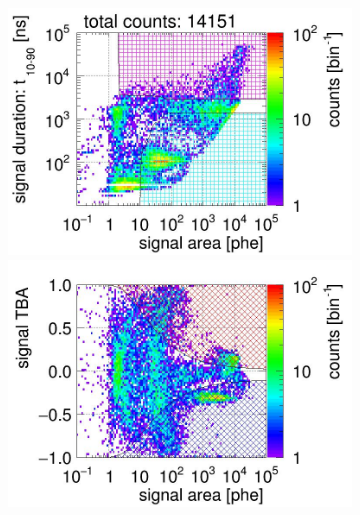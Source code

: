 \begin{landscape}%
	\begin{figure}[!p]
		\centering
		\begin{subfigure}[t]{0.32\textwidth} %
			\centering
			\includegraphics[width=\figurewidth,clip,trim={0 98 0 15}]{Figures/GasTest/CutsValid/res64850/pdpa22Vecfig64850.jpg}
			\includegraphics[width=\figurewidth,clip,trim={0 8 0 40}]{Figures/GasTest/CutsValid/res64850/tbapa22Vecfig64850.jpg}
			\caption{}
			\label{fig:signal selection dv -12 01}
		\end{subfigure}
		\begin{subfigure}[t]{0.32\textwidth}
			\centering

\end{subfigure}
\end{figure}
\end{landscape}
